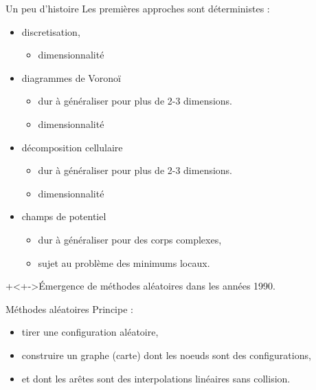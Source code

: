 
%
%

\begin{frame}[<+->]{Un peu d'histoire}
  Les premi\`eres approches sont d\'eterministes :
  \begin{itemize}
    \item discretisation,
      \begin{itemize}
        \item dimensionnalit\'e
      \end{itemize}
    \item diagrammes de Vorono\"i
      \begin{itemize}
        \item dur \`a g\'en\'eraliser pour plus de 2-3 dimensions.
        \item dimensionnalit\'e
      \end{itemize}
    \item décomposition cellulaire
      \begin{itemize}
        \item dur \`a g\'en\'eraliser pour plus de 2-3 dimensions.
        \item dimensionnalit\'e
      \end{itemize}
    \item champs de potentiel
      \begin{itemize}
        \item dur \`a g\'en\'eraliser pour des corps complexes,
        \item sujet au probl\`eme des minimums locaux.
      \end{itemize}
  \end{itemize}
  \onslide+<+->{\'Emergence de m\'ethodes al\'eatoires dans les ann\'ees 1990.}
\end{frame}

%
%

\begin{frame} {M\'ethodes al\'eatoires}
  Principe :
  \begin{itemize}
    \item tirer une configuration al\'eatoire,
      \pause
    \item construire un graphe (carte) dont les noeuds sont des configurations,
      \pause
    \item et dont les ar\^etes sont des interpolations lin\'eaires sans collision.
  \end{itemize}
\end{frame}

